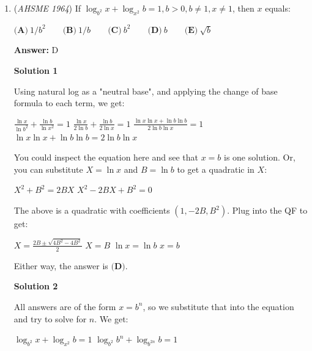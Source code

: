 \begin{enumerate}
 \textbf{Answer: }B



\textbf{Solution}

For any polynomial, even a polynomial with more than one variable, the sum of all the coefficients (including the constant, which is the coefficient of $x^0y^0$) is found by setting all variables equal to $1$.  Note that we don't have to worry about whether a constant is a coefficient of an "invisible" $x^0y^0$ term, because there is no such term here.

 Setting $x=y=1$ gives $(-1)^{18}$, which is equal to $1$, which is answer $\boxed{\textbf{(B)}}$.

 


	\item (\textit{AHSME 1964}) If $\log_{b^2}x+\log_{x^2}b=1, b>0, b \neq 1, x \neq 1$, then $x$ equals:


 $\textbf{(A)}\ 1/b^2 \qquad \textbf{(B)}\ 1/b \qquad \textbf{(C)}\ b^2 \qquad \textbf{(D)}\ b \qquad \textbf{(E)}\ \sqrt{b}$

 \textbf{Answer: }D



\textbf{Solution 1}

Using natural log as a "neutral base", and applying the change of base formula to each term, we get:

 $\frac{\ln x}{\ln b^2} + \frac{\ln b}{\ln x^2} = 1$
$\frac{\ln x}{2\ln b} + \frac{\ln b}{2\ln x} = 1$
$\frac{\ln x \ln x + \ln b \ln b}{2\ln b \ln x} = 1$
$\ln x \ln x + \ln b \ln b = 2\ln b \ln x$

 You could inspect the equation here and see that $x=b$ is one solution.  Or, you can substitute $X = \ln x$ and $B = \ln b$ to get a quadratic in $X$:

 $X^2 + B^2 = 2BX$
$X^2 - 2BX + B^2 = 0$

 The above is a quadratic with coefficients $(1, -2B, B^2)$.  Plug into the QF to get:

 $X = \frac{2B \pm \sqrt{4B^2 - 4B^2}}{2}$
$X = B$
$\ln x = \ln b$
$x = b$

 Either way, the answer is $\boxed{\textbf{(D)}}$.

 



\textbf{Solution 2}

All answers are of the form $x = b^n$, so we substitute that into the equation and try to solve for $n$.  We get:

 $\log_{b^2}x+\log_{x^2}b=1$
$\log_{b^2}b^n + \log_{b^{2n}} b = 1$


\end{enumerate}
